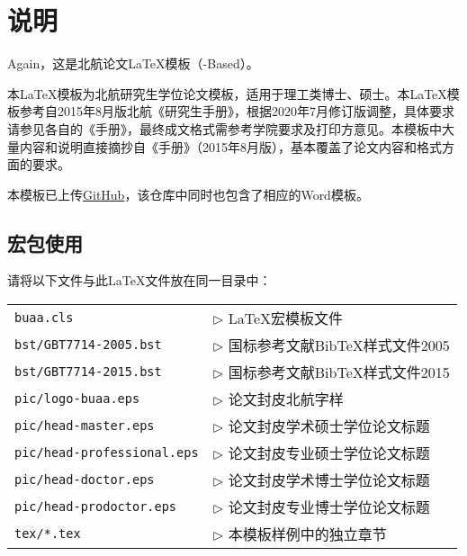 \chapter{说明}

Again，这是北航论文\LaTeX{}模板（\CTeX{}-Based）\BUAAThesis{}。

本\LaTeX{}模板为北航研究生学位论文模板，适用于理工类博士、硕士。本\LaTeX{}模板参考自2015年8月版北航《研究生手册》，根据2020年7月修订版调整，具体要求请参见各自的《手册》，最终成文格式需参考学院要求及打印方意见。本模板中大量内容和说明直接摘抄自《手册》（2015年8月版），基本覆盖了论文内容和格式方面的要求。

本模板已上传\href{https://github.com/CheckBoxStudio/BUAAThesis}{GitHub}，该仓库中同时也包含了相应的Word模板。

\section{宏包使用}

请将以下文件与此LaTeX文件放在同一目录中：

\begin{tabular}{ll}
 \verb|buaa.cls |                 & $\triangleright$ LaTeX宏模板文件 \\
 \verb|bst/GBT7714-2005.bst|      & $\triangleright$ 国标参考文献BibTeX样式文件2005 \\
 \verb|bst/GBT7714-2015.bst|      & $\triangleright$ 国标参考文献BibTeX样式文件2015 \\
 \verb|pic/logo-buaa.eps|         & $\triangleright$ 论文封皮北航字样 \\
 \verb|pic/head-master.eps|       & $\triangleright$ 论文封皮学术硕士学位论文标题\\
 \verb|pic/head-professional.eps| & $\triangleright$ 论文封皮专业硕士学位论文标题\\
 \verb|pic/head-doctor.eps|       & $\triangleright$ 论文封皮学术博士学位论文标题\\
 \verb|pic/head-prodoctor.eps|    & $\triangleright$ 论文封皮专业博士学位论文标题\\
 \verb|tex/*.tex|                 & $\triangleright$ 本模板样例中的独立章节\\
\end{tabular}\\


